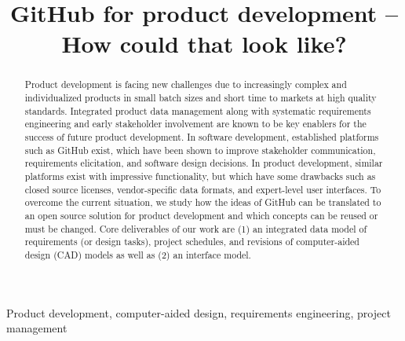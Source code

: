 \title{GitHub for product development -- How could that look like?}

\author{
    \and
    \and
}

\maketitle

\begin{abstract}
    Product development is facing new challenges due to increasingly complex and individualized products in small batch sizes and short time to markets at high quality standards.
    Integrated product data management along with systematic requirements engineering and early stakeholder involvement are known to be key enablers for the success of future product development.
    In software development, established platforms such as GitHub exist, which have been shown to improve stakeholder communication, requirements elicitation, and software design decisions.
    In product development, similar platforms exist with impressive functionality, but which have some drawbacks such as closed source licenses, vendor-specific data formats, and expert-level user interfaces.
    To overcome the current situation, we study how the ideas of GitHub can be translated to an open source solution for product development and which concepts can be reused or must be changed.
    Core deliverables of our work are (1) an integrated data model of requirements (or design tasks), project schedules, and revisions of computer-aided design (CAD) models as well as (2) an interface model.
\end{abstract}

\begin{IEEEkeywords}
    Product development, computer-aided design, requirements engineering, project management
\end{IEEEkeywords}